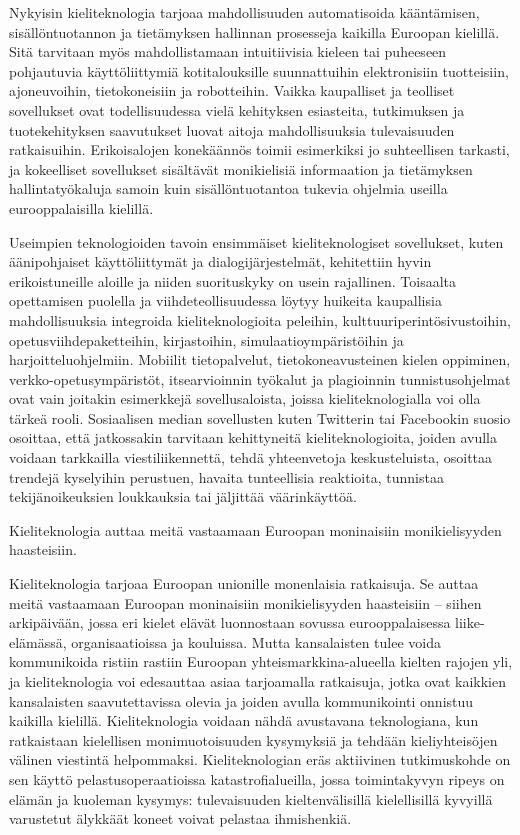 \documentclass[]{../../metanetpaper}
\begin{document}
\begin{Parallel}[c]{70mm}{70mm}
{Nykyisin kieliteknologia tarjoaa mahdollisuuden automatisoida kääntämisen,
sisällöntuotannon ja tietämyksen hallinnan prosesseja kaikilla Euroopan
kielillä. Sitä tarvitaan myös mahdollistamaan intuitiivisia kieleen tai
puheeseen pohjautuvia käyttöliittymiä kotitalouksille suunnattuihin
elektronisiin tuotteisiin, ajoneuvoihin, tietokoneisiin ja robotteihin. Vaikka
kaupalliset ja teolliset sovellukset ovat todellisuudessa vielä kehityksen
esiasteita, tutkimuksen ja tuotekehityksen saavutukset luovat aitoja
mahdollisuuksia tulevaisuuden ratkaisuihin. Erikoisalojen konekäännös toimii
esimerkiksi jo suhteellisen tarkasti, ja kokeelliset sovellukset sisältävät
monikielisiä informaation ja tietämyksen hallintatyökaluja samoin kuin
sisällöntuotantoa tukevia ohjelmia useilla eurooppalaisilla kielillä.

Useimpien teknologioiden tavoin ensimmäiset kieliteknologiset sovellukset,
kuten äänipohjaiset käyttöliittymät ja dialogijärjestelmät, kehitettiin hyvin
erikoistuneille aloille ja niiden suorituskyky on usein rajallinen. Toisaalta
opettamisen puolella ja viihdeteollisuudessa löytyy huikeita kaupallisia
mahdollisuuksia integroida kieliteknologioita peleihin,
kulttuuriperintösivustoihin, opetusviihdepaketteihin, kirjastoihin,
simulaatioympäristöihin ja harjoitteluohjelmiin. Mobiilit tietopalvelut,
tietokoneavusteinen kielen oppiminen, verkko-opetusympäristöt, itsearvioinnin
työkalut ja plagioinnin tunnistusohjelmat ovat vain joitakin esimerkkejä
sovellusaloista, joissa kieliteknologialla voi olla tärkeä rooli. Sosiaalisen
median sovellusten kuten Twitterin tai Facebookin suosio osoittaa, että
jatkossakin tarvitaan kehittyneitä kieliteknologioita, joiden avulla voidaan
tarkkailla viestiliikennettä, tehdä yhteenvetoja keskusteluista, osoittaa
trendejä kyselyihin perustuen, havaita tunteellisia reaktioita, tunnistaa
tekijänoikeuksien loukkauksia tai jäljittää väärinkäyttöä.

Kieliteknologia auttaa meitä vastaamaan Euroopan moninaisiin monikielisyyden
haasteisiin.



Kieliteknologia tarjoaa Euroopan unionille monenlaisia ratkaisuja. Se auttaa
meitä vastaamaan Euroopan moninaisiin monikielisyyden haasteisiin – siihen
arkipäivään, jossa eri kielet elävät luonnostaan sovussa eurooppalaisessa
liike-elämässä, organisaatioissa ja kouluissa. Mutta kansalaisten tulee voida
kommunikoida ristiin rastiin Euroopan yhteismarkkina-alueella kielten rajojen
yli, ja kieliteknologia voi edesauttaa asiaa tarjoamalla ratkaisuja, jotka ovat
kaikkien kansalaisten saavutettavissa olevia ja joiden avulla kommunikointi
onnistuu kaikilla kielillä. Kieliteknologia voidaan nähdä avustavana
teknologiana, kun ratkaistaan kielellisen monimuotoisuuden kysymyksiä ja
tehdään kieliyhteisöjen välinen viestintä helpommaksi. Kieliteknologian eräs
aktiivinen tutkimuskohde on sen käyttö pelastusoperaatioissa
katastrofialueilla, jossa toimintakyvyn ripeys on elämän ja kuoleman kysymys:
tulevaisuuden kieltenvälisillä kielellisillä kyvyillä varustetut älykkäät
koneet voivat pelastaa ihmishenkiä.

}
\end{Parallel}
\end{document}
